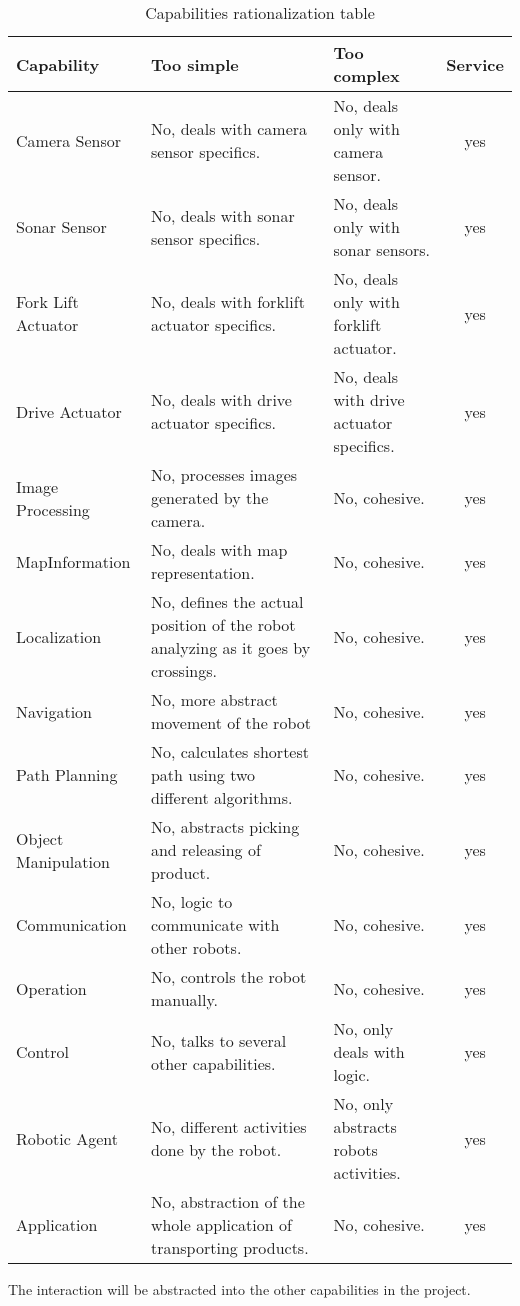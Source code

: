 \begin{table}[ht]
	\footnotesize
	\centering
	\begin{tabular}{| l | p{3.2cm} | p{3.2cm} | c |}
		\hline
		Capability & Too simple & Too complex & Service\\
		\hline
		Camera Sensor 		& No, deals with camera sensor specifics. & No, deals only with camera sensor. & yes\\
		\hline
		Sonar Sensor 		& No, deals with sonar sensor specifics. & No, deals only with sonar sensors. & yes\\
		\hline
		Fork Lift Actuator 	& No, deals with forklift actuator specifics. & No, deals only with forklift actuator. & yes\\
		\hline
		Drive Actuator 		& No, deals with drive actuator specifics. & No, deals with drive actuator specifics. & yes\\
		\hline
		Image Processing 	& No, processes images generated by the camera. & No, cohesive. & yes\\
		\hline
		MapInformation		& No, deals with map representation. & No, cohesive. & yes \\
		\hline
		Localization 		& No, defines the actual position of the robot analyzing as it goes by crossings. & No, cohesive. & yes\\ %
		\hline
		Navigation 			& No, more abstract movement of the robot & No, cohesive. & yes\\
		\hline
		Path Planning 		& No, calculates shortest path using two different algorithms. & No, cohesive. & yes\\
		\hline
		Object Manipulation & No, abstracts picking and releasing of product. & No, cohesive. & yes\\
		\hline
		Communication 		& No, logic to communicate with other robots. & No, cohesive. & yes\\
		\hline
		Operation	 		& No, controls the robot manually. & No, cohesive. & yes\\
		\hline
		Control 			& No, talks to several other capabilities. & No, only deals with logic. & yes\\
		\hline
		Robotic Agent 		& No, different activities done by the robot. & No, only abstracts robots activities. & yes\\
		\hline
		Application 		& No, abstraction of the whole application of transporting products. & No, cohesive. & yes\\
		\hline
	\end{tabular}
	\caption{Capabilities rationalization table}
\end{table}

The interaction will be abstracted into the other capabilities in the project.